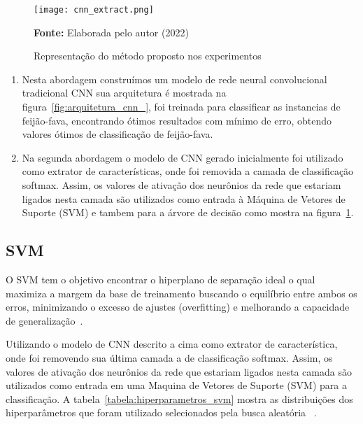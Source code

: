 \begin{figure}[H]
\centering
\texttt{[image: cnn\_extract.png]}
\caption{Representação do método proposto nos experimentos}
\label{fig:esquematica_cnn_}
\par\medskip\selectfont\textbf{Fonte:} Elaborada pelo autor (2022) \par\medskip
\end{figure}


\begin{enumerate}
\item Nesta abordagem construímos um modelo de rede neural convolucional tradicional CNN sua arquitetura é mostrada na figura~\ref{fig:arquitetura_cnn_}, foi treinada para classificar as instancias de feijão-fava, encontrando ótimos resultados com mínimo de erro, obtendo valores ótimos de classificação de feijão-fava. %
\item Na segunda abordagem o modelo de CNN gerado inicialmente foi utilizado como extrator de características, onde foi removida a camada de classificação softmax. Assim, os valores de ativação dos neurônios da rede que estariam ligados nesta camada são utilizados como entrada à Máquina de Vetores de Suporte (SVM) e tambem para a árvore de decisão como mostra na figura~\ref{fig:esquematica_cnn_}.
\end{enumerate}



\subsection{SVM}

O SVM tem o objetivo encontrar o hiperplano de separação ideal o qual maximiza a margem da base de treinamento buscando o equilíbrio entre ambos os erros, minimizando o excesso de ajustes (overfitting) e melhorando a capacidade de generalização~\cite{vapnik1995nature}. 

Utilizando o modelo de CNN descrito a cima como extrator de característica, onde foi removendo sua última camada a de classificação softmax. Assim, os valores de ativação dos neurônios da rede que estariam ligados nesta camada são utilizados como entrada em uma Maquina de Vetores de Suporte (SVM) para a classificação. A tabela~\ref{tabela:hiperparametros_svm} mostra as distribuições dos hiperparâmetros que foram utilizado selecionados pela busca aleatória  ~\cite{Bergstra_James}.

